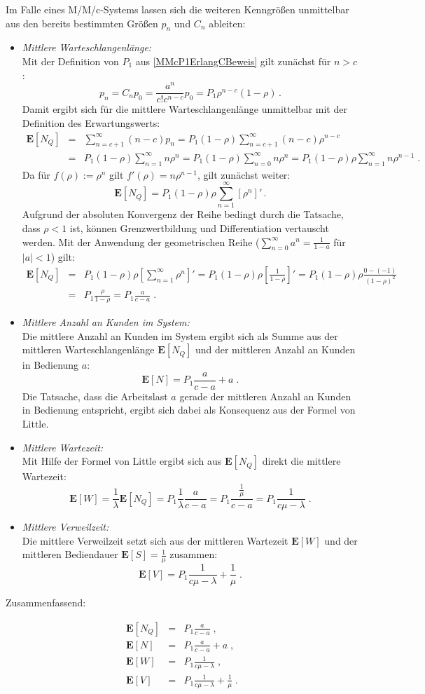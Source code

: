 \documentclass[a4paper,11pt,oneside]{article}
\theoremstyle{definition}
\begin{document}
Im Falle eines M/M/c-Systems lassen sich die weiteren Kenngrößen unmittelbar aus den bereits bestimmten Größen $p_n$ und $C_n$ ableiten:

\begin{itemize}
\item
\emph{Mittlere Warteschlangenlänge:}~\\
Mit der Definition von $P_1$ aus \eqref{MMcP1ErlangCBeweis} gilt zunächst für $n>c$:
$$
p_n=C_np_0=\frac{a^n}{c!c^{n-c}}p_0=P_1\rho^{n-c}(1-\rho)\,.
$$
Damit ergibt sich für die mittlere Warteschlangenlänge unmittelbar mit der Definition des Erwartungswerts:
\begin{eqnarray*}
{\mathbf E}[N_Q]&=&
\sum_{n=c+1}^\infty(n-c)p_n=
P_1(1-\rho)\sum_{n=c+1}^\infty(n-c)\rho^{n-c}\\&=&
P_1(1-\rho)\sum_{n=1}^\infty n\rho^n=
P_1(1-\rho)\sum_{n=0}^\infty n\rho^n=
P_1(1-\rho)\rho\sum_{n=1}^\infty n\rho^{n-1}\;.
\end{eqnarray*}
Da für $f(\rho):=\rho^n$ gilt $f'(\rho)=n\rho^{n-1}$, gilt zunächst weiter:
$$
{\mathbf E}[N_Q]=P_1(1-\rho)\rho\sum_{n=1}^\infty \left[\rho^n\right]'\,.
$$
Aufgrund der absoluten Konvergenz der Reihe bedingt durch die Tatsache, dass $\rho<1$ ist, können Grenzwertbildung und Differentiation vertauscht werden. Mit der Anwendung der geometrischen Reihe ($\sum_{n=0}^\infty a^n=\frac{1}{1-a}$ für $|a|<1$) gilt:
\begin{eqnarray*}
{\mathbf E}[N_Q]&=&
P_1(1-\rho)\rho\left[\sum_{n=1}^\infty \rho^n\right]'=
P_1(1-\rho)\rho\left[\frac{1}{1-\rho}\right]'=
P_1(1-\rho)\rho\frac{0-(-1)}{(1-\rho)^2}\\&=&
P_1\frac{\rho}{1-\rho}=
P_1\frac{a}{c-a}\;.
\end{eqnarray*}
\item
\emph{Mittlere Anzahl an Kunden im System:}~\\
Die mittlere Anzahl an Kunden im System ergibt sich als Summe aus der mittleren Warteschlangenlänge ${\mathbf E}[N_Q]$ und der mittleren Anzahl an Kunden in Bedienung $a$:
$$
{\mathbf E}[N]=P_1\frac{a}{c-a}+a\;.
$$
Die Tatsache, dass die Arbeitslast $a$ gerade der mittleren Anzahl an Kunden in Bedienung entspricht, ergibt sich dabei als Konsequenz aus der Formel von Little.
\item
\emph{Mittlere Wartezeit:}~\\
Mit Hilfe der Formel von Little ergibt sich aus ${\mathbf E}[N_Q]$ direkt die mittlere Wartezeit:
$$
{\mathbf E}[W]=
\frac{1}{\lambda}{\mathbf E}[N_Q]=
P_1\frac{1}{\lambda}\frac{a}{c-a}=
P_1\frac{\frac{1}{\mu}}{c-a}=
P_1\frac{1}{c\mu-\lambda}\;.
$$
\item
\emph{Mittlere Verweilzeit:}~\\
Die mittlere Verweilzeit setzt sich aus der mittleren Wartezeit ${\mathbf E}[W]$ und der mittleren Bediendauer ${\mathbf E}[S]=\frac{1}{\mu}$ zusammen:
$$
{\mathbf E}[V]=P_1\frac{1}{c\mu-\lambda}+\frac{1}{\mu}\;.
$$
\end{itemize}

Zusammenfassend:
\begin{tcolorbox}
\begin{eqnarray*}
\mathbf{E}[N_Q]&=&P_1\frac{a}{c-a}\;,\\
\mathbf{E}[N]&=&P_1\frac{a}{c-a}+a\;,\\
\mathbf{E}[W]&=&P_1\frac{1}{c\mu-\lambda}\;,\\
\mathbf{E}[V]&=&P_1\frac{1}{c\mu-\lambda}+\frac{1}{\mu}\;.
\end{eqnarray*}
\end{tcolorbox}
\end{document}
